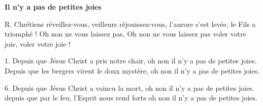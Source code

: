 \textbf{Il n’y a pas de petites joies}

R.  Chrétiens réveillez-vous, veilleurs réjouissez-vous,
l’aurore s’est levée, le Fils a triomphé ! Oh non ne vous laissez pas, Oh non ne vous laissez pas voler votre joie, voler votre joie !

1. Depuis que Jésus Christ a pris notre chair, oh non il n’y a pas de petites joies. Depuis que les bergers virent le doux mystère, oh non il n’y a pas de petites joies.

6.
Depuis que Jésus Christ a vaincu la mort, oh non il n’y a pas de petites joies.
depuis que par le feu, l’Esprit nous rend forts oh non il n’y a pas de petites joies.
